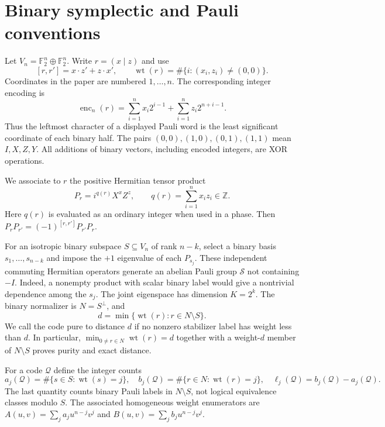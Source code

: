 \documentclass[11pt,a4paper]{article}
\newcommand{\F}{\mathbb F_2}
\newcommand{\wt}{\operatorname{wt}}
\begin{document}
\section{Binary symplectic and Pauli conventions}\label{sec:notation}
Let $V_n=\F^n\oplus\F^n$. Write $r=(x\mid z)$ and use
\begin{equation}\label{eq:pair}
 [r,r']=x\cdot z'+z\cdot x',\qquad
 \wt(r)=\#\{i:(x_i,z_i)\ne(0,0)\}.
\end{equation}
Coordinates in the paper are numbered $1,\ldots,n$. The corresponding integer encoding is
\begin{equation}\label{eq:int}
 \operatorname{enc}_n(r)=\sum_{i=1}^n x_i2^{i-1}+\sum_{i=1}^n z_i2^{n+i-1}.
\end{equation}
Thus the leftmost character of a displayed Pauli word is the least significant coordinate of each binary half. The pairs $(0,0),(1,0),(0,1),(1,1)$ mean $I,X,Z,Y$. All additions of binary vectors, including encoded integers, are XOR operations.

We associate to $r$ the positive Hermitian tensor product
\begin{equation}\label{eq:hermitian}
 P_r=i^{q(r)}X^xZ^z,\qquad q(r)=\sum_{i=1}^n x_i z_i\in\mathbb Z.
\end{equation}
Here $q(r)$ is evaluated as an ordinary integer when used in a phase. Then $P_rP_{r'}=(-1)^{[r,r']}P_{r'}P_r$.

For an isotropic binary subspace $S\subseteq V_n$ of rank $n-k$, select a binary basis $s_1,\ldots,s_{n-k}$ and impose the $+1$ eigenvalue of each $P_{s_j}$. These independent commuting Hermitian operators generate an abelian Pauli group $\mathcal S$ not containing $-I$. Indeed, a nonempty product with scalar binary label would give a nontrivial dependence among the $s_j$. The joint eigenspace has dimension $K=2^k$. The binary normalizer is $N=S^\perp$, and
\begin{equation}\label{eq:distance}
 d=\min\{\wt(r):r\in N\setminus S\}.
\end{equation}
We call the code pure to distance $d$ if no nonzero stabilizer label has weight less than $d$. In particular, $\min_{0\ne r\in N}\wt(r)=d$ together with a weight-$d$ member of $N\setminus S$ proves purity and exact distance.

For a code $\mathcal Q$ define the integer counts
\begin{equation}\label{eq:enumerators}
 a_j(\mathcal Q)=\#\{s\in S:\wt(s)=j\},\quad
 b_j(\mathcal Q)=\#\{r\in N:\wt(r)=j\},\quad
 \ell_j(\mathcal Q)=b_j(\mathcal Q)-a_j(\mathcal Q).
\end{equation}
The last quantity counts binary Pauli labels in $N\setminus S$, not logical equivalence classes modulo $S$. The associated homogeneous weight enumerators are $A(u,v)=\sum_j a_ju^{n-j}v^j$ and $B(u,v)=\sum_j b_ju^{n-j}v^j$.
\end{document}
